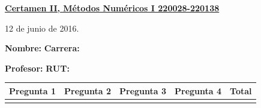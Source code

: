 \documentclass[11pt]{article}
\begin{document}
\hspace*{-1,5cm}

\vspace*{0.5cm} \centerline {\bf\underline{Certamen II, M\'etodos Num\'ericos I 220028-220138 }}
\centerline{\textrm{12 de junio de 2016.}}  \vspace{0.2cm}


\textbf{Nombre:} \hspace{0.5\textwidth}\textbf{Carrera:}

\vspace{0.1cm}
\textbf{Profesor:}\hspace{0.5\textwidth} \textbf{ RUT:}

\begin{center}
 \begin{tabular}{||p{2cm}|p{2cm}|p{2cm}|p{2cm}||p{2cm}||}
 \hline
 Pregunta 1 &  Pregunta 2 &     Pregunta 3  & Pregunta 4 &Total\\
 \hline

  \vspace{1.5cm} & & & & \\
 \hline
 \end{tabular}
 \end{center}
\end{document}
